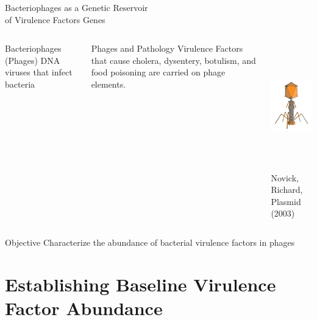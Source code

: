 \documentclass[11pt]{beamer}
\begin{document}
	\begin{frame}{Bacteriophages as a Genetic Reservoir \\ of Virulence Factors Genes}
	\begin{columns}
	\begin{block}{Bacteriophages (Phages)}
	DNA viruses that infect bacteria
	\end{block}
	
	
	\begin{block}{Phages and Pathology}
	Virulence Factors that cause cholera, dysentery, botulism, and food poisoning are carried on phage elements.
	\end{block}
	
	\includegraphics[height=5.5cm, width=5cm]{phage.png} \\
	\hspace{0.5cm}	
	\tiny{Novick, Richard, Plasmid (2003)}
	\end{columns}
	
	\begin{block}{Objective}
	Characterize the abundance of bacterial virulence factors in phages
	\end{block}
	
	\end{frame}

	
\section{Establishing Baseline Virulence Factor Abundance}
\subsection{}
\end{document}

